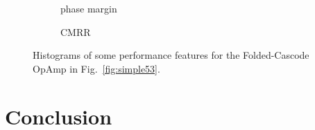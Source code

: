 \documentclass[conference]{IEEEtran}
\begin{document}
\begin{figure}[]
\begin{subfigure}{0.12\textwidth}
		\vspace{-1.4\baselineskip}
		\caption{{\footnotesize phase margin}}
		\label{fig:53ph}
		\end{subfigure}
		\hfill
		\begin{subfigure}{0.12\textwidth}
		\vspace{-1.4\baselineskip}
		\caption{{\footnotesize CMRR}}
		\label{fig:53cmrr}
		\end{subfigure}
		\setlength{\abovecaptionskip}{4ex}%
		\setlength{\belowcaptionskip}{-4ex}%
		\caption{Histograms of some performance features for the Folded-Cascode OpAmp in Fig.~\ref{fig:simple53}.}
		\label{fig:perffeatures53}
		\end{figure}
	

	
	
\section{Conclusion}
	



\end{document}
